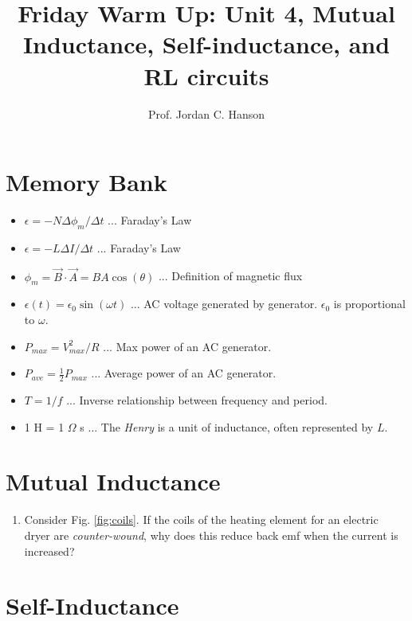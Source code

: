 \documentclass{article}
\begin{document}
\twocolumn

\title{Friday Warm Up: Unit 4, Mutual Inductance, Self-inductance, and RL circuits}
\author{Prof. Jordan C. Hanson}

\maketitle

\section{Memory Bank}

\begin{itemize}
\item $\epsilon = -N \Delta \phi_m /\Delta t$ ... Faraday's Law
\item $\epsilon = -L \Delta I /\Delta t$ ... Faraday's Law
\item $\phi_m = \vec{B} \cdot \vec{A} = BA \cos(\theta)$ ... Definition of magnetic flux
\item $\epsilon(t) = \epsilon_0 \sin(\omega t)$ ... AC voltage generated by generator.  $\epsilon_0$ is proportional to $\omega$.
\item $P_{max} = V_{max}^2/R$ ... Max power of an AC generator.
\item $P_{ave} = \frac{1}{2} P_{max}$ ... Average power of an AC generator.
\item $T = 1/f$ ... Inverse relationship between frequency and period.
\item 1 H = 1 $\Omega$ s ... The \textit{Henry} is a unit of inductance, often represented by $L$.
\end{itemize}

\section{Mutual Inductance}

\begin{enumerate}
\item Consider Fig. \ref{fig:coils}.  If the coils of the heating element for an electric dryer are \textit{counter-wound}, why does this reduce back emf when the current is increased? \\ \vspace{2cm}
\end{enumerate}

\section{Self-Inductance}
\end{document}
